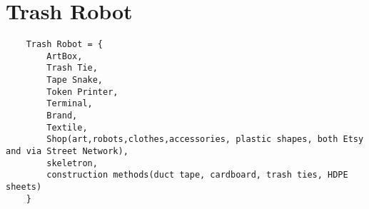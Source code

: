 \section{Trash Robot}

\begin{verbatim}
    Trash Robot = {
        ArtBox,
        Trash Tie,
        Tape Snake,
        Token Printer,
        Terminal,
        Brand,
        Textile,
        Shop(art,robots,clothes,accessories, plastic shapes, both Etsy and via Street Network),
        skeletron,
        construction methods(duct tape, cardboard, trash ties, HDPE sheets)
    }
\end{verbatim}
    
